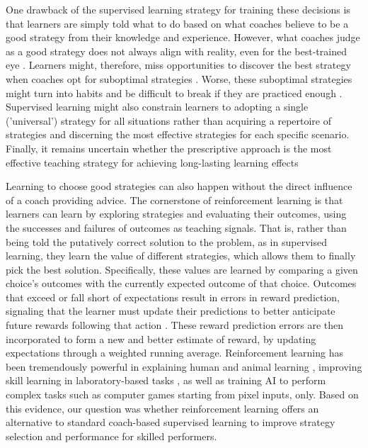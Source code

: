 \documentclass[pdflatex,sn-mathphys-num]{sn-jnl}%
\theoremstyle{thmstyleone}%
\theoremstyle{thmstyletwo}%
\theoremstyle{thmstylethree}%
\begin{document}
One drawback of the supervised learning strategy for training these decisions is that learners are simply told what to do based on what coaches believe to be a good strategy from their knowledge and experience. However, what coaches judge as a good strategy does not always align with reality, even for the best-trained eye \cite{supej_impact_2019, cochrum_visual_2021}. Learners might, therefore, miss opportunities to discover the best strategy when coaches opt for suboptimal strategies \cite{gray_plateaus_2017}. Worse, these suboptimal strategies might turn into habits and be difficult to break if they are practiced enough \cite{popp_effect_2020}.  Supervised learning might also constrain learners to adopting a single ('universal') strategy for all situations rather than acquiring a repertoire of strategies and discerning the most effective strategies for each specific scenario. Finally, it remains uncertain whether the prescriptive approach is the most effective teaching strategy for achieving long-lasting learning effects \cite{wulf_instructions_1997, hodges_role_1999, williams_practice_2005,williams_effective_2023} 

Learning to choose good strategies can also happen without the direct influence of a coach providing advice. The cornerstone of reinforcement learning \cite{sutton_reinforcement_2018} is that learners can learn by exploring strategies and evaluating their outcomes, using the successes and failures of outcomes as teaching signals. That is, rather than being told the putatively correct solution to the problem, as in supervised learning, they learn the value of different strategies, which allows them to finally pick the best solution. Specifically, these values are learned by comparing a given choice's outcomes with the currently expected outcome of that choice. Outcomes that exceed or fall short of expectations result in errors in reward prediction, signaling that the learner must update their predictions to better anticipate future rewards following that action \cite{rescorla_theory_1972}. These reward prediction errors are then incorporated to form a new and better estimate of reward, by updating expectations through a weighted running average. Reinforcement learning has been tremendously powerful in explaining human and animal learning \cite{waelti_dopamine_2001, schultz_neural_1997, pessiglione_dopamine-dependent_2006}, improving skill learning in laboratory-based tasks \cite{lior_shmuelof_overcoming_2012, abe_reward_2011, truong_error-based_2023, hasson_reinforcement_2015}, as well as training AI to perform complex tasks such as computer games starting from pixel inputs, only\cite{mnih_human-level_2015}. Based on this evidence, our question was whether reinforcement learning offers an alternative to standard coach-based supervised learning to improve strategy selection and performance for skilled performers. 
\end{document}

